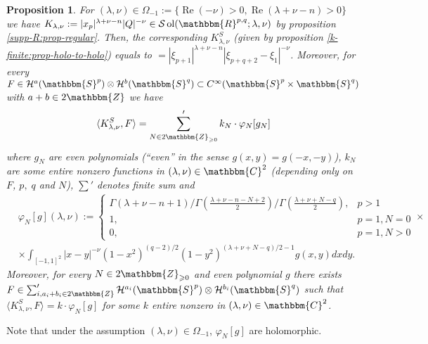 \documentclass{article}
\newcommand{\assign}{:=}
\newcommand{\tmop}[1]{\ensuremath{\operatorname{#1}}}
\newcommand{\upl}{+}
\newtheorem{proposition}{Proposition}
{\theorembodyfont{\rmfamily}\newtheorem{remark}{Remark}}
\begin{document}
\begin{proposition}
  \label{k-finite:prop-KR-hook-1}For $(\lambda, \nu) \in \Omega_{- 1} \assign
  \{ \tmop{Re} (- \nu) > 0, \tmop{Re} (\lambda + \nu - n) > 0 \}$ we have
  $K_{\lambda, \nu} \assign | x_p |^{\lambda + \nu - n} | Q |^{- \nu} \in
  \mathcal{S} \tmop{ol} (\mathbbm{R}^{p, q} ; \lambda, \nu)$ by proposition
  \ref{supp-R:prop-regular}. Then, the corresponding $K_{\lambda, \nu}^S$
  (given by proposition \ref{k-finite:prop-holo-to-holo}) equals to $= |
  \xi_{p + 1} |^{\lambda + \nu - n} | \xi_{p + q + 2} - \xi_1 |^{- \nu}$.
  Moreover, for every $F \in \mathcal{H}^a (\mathbbm{S}^p) \otimes
  \mathcal{H}^b (\mathbbm{S}^q) \subset C^{\infty} (\mathbbm{S}^p \times
  \mathbbm{S}^q)$ with $a + b \in 2\mathbbm{Z}$ we have
  \begin{equation}
    \langle K^S_{\lambda, \nu}, F \rangle = \sum'_{N \in
    2\mathbbm{Z}_{\geqslant 0}} k_N \cdot \varphi_N [g_N]
    \label{k-finite:eq-hookR}
  \end{equation}
  where $g_N$ are even polynomials (``even'' in the sense $g (x, y) = g (- x,
  - y)$), $k_N$ are some entire nonzero functions in $(\lambda, \nu) \in
  \mathbbm{C}^2$ (depending only on $F$, $p, \; q$ and $N$), $\sum'$ denotes
  finite sum and
  \begin{eqnarray}
    & \varphi_N [g] (\lambda, \nu) \assign \left\{ \begin{array}{ll}
      \Gamma (\lambda + \nu - n + 1) / \Gamma \left( \frac{\lambda + \nu - n -
      N \upl 2}{2} \right) / \Gamma \left( \frac{\lambda + \nu + N - q}{2}
      \right), & p > 1\\
      1, & p = 1, N = 0\\
      0, & p = 1, N > 0
    \end{array} \right. \times &  \nonumber\\
    & \times \int_{[- 1, 1]^2} | x - y |^{- \nu} (1 - x^2)^{(q - 2) / 2} (1 -
    y^2)^{(\lambda + \nu + N - q) / 2 - 1} g (x, y) d x d y. &  \nonumber
  \end{eqnarray}
  Moreover, for every $N \in 2\mathbbm{Z}_{\geqslant 0}$ and even polynomial
  $g$ there exists $F \in \sum_{i, a_i + b_i \in 2\mathbbm{Z}}'
  \mathcal{H}^{a_i} (\mathbbm{S}^p) \otimes \mathcal{H}^{b_i} (\mathbbm{S}^q)$
  such that $\langle K_{\lambda, \nu}^S, F \rangle = k \cdot \varphi_N [g]$
  for some $k$ entire nonzero in $(\lambda, \nu) \in \mathbbm{C}^2$.
\end{proposition}

\begin{remark}
  Note that under the assumption $(\lambda, \nu) \in \Omega_{- 1}$, $\varphi_N
  [g]$ are holomorphic.
\end{remark}
\end{document}
